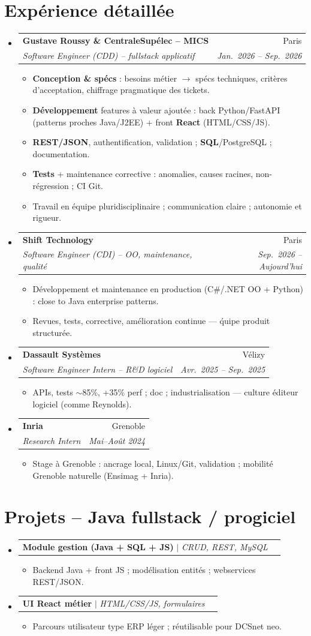 \documentclass[a4paper,10.5pt]{article}
\makeatletter
\newcommand{\resumeItem}[1]{\item\small{#1}}
\newcommand{\resumeSubheading}[4]{\vspace{2.5pt}\item\begin{tabular*}{0.97\textwidth}[t]{l@{\extracolsep{\fill}}r}\textbf{#1}&{#2}\\\textit{\small #3}&\textit{\small #4}\\\end{tabular*}\vspace{1pt}}
\newcommand{\resumeProjectHeading}[2]{\vspace{1.5pt}\item\begin{tabular*}{0.97\textwidth}{l@{\extracolsep{\fill}}r}\small #1&#2\\\end{tabular*}\vspace{1pt}}
\newcommand{\resumeSubHeadingListStart}{\begin{itemize}[leftmargin=0.08in,label={}]}
\newcommand{\resumeSubHeadingListEnd}{\end{itemize}}
\makeatother
\begin{document}
\section{Exp\'erience d\'etaill\'ee}
\resumeSubHeadingListStart
  \resumeSubheading
    {Gustave Roussy \& CentraleSup\'elec -- MICS}{Paris}
    {Software Engineer (CDD) -- fullstack applicatif}{Jan.~2026 -- Sep.~2026}
    \begin{itemize}
      \resumeItem{\textbf{Conception \& sp\'ecs} : besoins m\'etier $\rightarrow$ sp\'ecs techniques, crit\`eres d'acceptation, chiffrage pragmatique des tickets.}
      \resumeItem{\textbf{D\'eveloppement} features \`a valeur ajout\'ee : back Python/FastAPI (patterns proches Java/J2EE) + front \textbf{React} (HTML/CSS/JS).}
      \resumeItem{\textbf{REST/JSON}, authentification, validation ; \textbf{SQL}/PostgreSQL ; documentation.}
      \resumeItem{\textbf{Tests} + maintenance corrective : anomalies, causes racines, non-r\'egression ; CI Git.}
      \resumeItem{Travail en \'equipe pluridisciplinaire ; communication claire ; autonomie et rigueur.}
    \end{itemize}
  \resumeSubheading
    {Shift Technology}{Paris}
    {Software Engineer (CDI) -- OO, maintenance, qualit\'e}{Sep.~2026 -- Aujourd'hui}
    \begin{itemize}
      \resumeItem{D\'eveloppement et maintenance en production (C\#/.NET OO + Python) : close to Java enterprise patterns.}
      \resumeItem{Revues, tests, corrective, am\'elioration continue --- \'quipe produit structur\'ee.}
    \end{itemize}
  \resumeSubheading
    {Dassault Syst\`emes}{V\'elizy}
    {Software Engineer Intern -- R\&D logiciel}{Avr.~2025 -- Sep.~2025}
    \begin{itemize}
      \resumeItem{APIs, tests $\sim$85\%, +35\% perf ; doc ; industrialisation --- culture \'editeur logiciel (comme Reynolds).}
    \end{itemize}
  \resumeSubheading
    {Inria}{Grenoble}
    {Research Intern}{Mai--Ao\^ut 2024}
    \begin{itemize}
      \resumeItem{Stage \`a Grenoble : ancrage local, Linux/Git, validation ; mobilit\'e Grenoble naturelle (Ensimag + Inria).}
    \end{itemize}
\resumeSubHeadingListEnd

\section{Projets -- Java fullstack / progiciel}
\resumeSubHeadingListStart
  \resumeProjectHeading{\textbf{Module gestion (Java + SQL + JS)} $|$ \emph{CRUD, REST, MySQL}}{}
  \begin{itemize}\resumeItem{Backend Java + front JS ; mod\'elisation entit\'es ; webservices REST/JSON.}\end{itemize}
  \resumeProjectHeading{\textbf{UI React m\'etier} $|$ \emph{HTML/CSS/JS, formulaires}}{}
  \begin{itemize}\resumeItem{Parcours utilisateur type ERP l\'eger ; r\'eutilisable pour DCSnet neo.}\end{itemize}
\resumeSubHeadingListEnd
\end{document}
